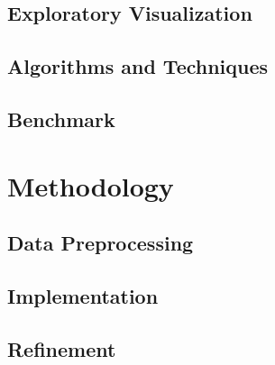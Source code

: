 \documentclass[paper=A4, DIV=calc, parskip=half]{scrartcl}
\begin{document}
\subsection*{Exploratory Visualization}


\subsection*{Algorithms and Techniques}


\subsection*{Benchmark}


\section*{Methodology}

\subsection*{Data Preprocessing}


\subsection*{Implementation}


\subsection*{Refinement}
\end{document}
